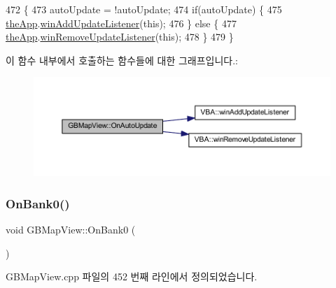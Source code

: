 \begin{DoxyCode}
472 \{
473   autoUpdate = !autoUpdate;
474   \textcolor{keywordflow}{if}(autoUpdate) \{
475     \mbox{\hyperlink{_v_b_a_8cpp_a8095a9d06b37a7efe3723f3218ad8fb3}{theApp}}.\mbox{\hyperlink{class_v_b_a_af0712f70a90d023ab8327a366be08174}{winAddUpdateListener}}(\textcolor{keyword}{this});
476   \} \textcolor{keywordflow}{else} \{
477     \mbox{\hyperlink{_v_b_a_8cpp_a8095a9d06b37a7efe3723f3218ad8fb3}{theApp}}.\mbox{\hyperlink{class_v_b_a_a2d31a0656df2230310aa8dc9e3a735d3}{winRemoveUpdateListener}}(\textcolor{keyword}{this});    
478   \}
479 \}
\end{DoxyCode}
이 함수 내부에서 호출하는 함수들에 대한 그래프입니다.\+:
\nopagebreak
\begin{figure}[H]
\begin{center}
\leavevmode
\includegraphics[width=350pt]{class_g_b_map_view_ad58a2f86c686e80be789229bdee2e64f_cgraph}
\end{center}
\end{figure}
\mbox{\label{class_g_b_map_view_a157cce075c5c7ad137098c04201ce30d}} 
\subsubsection{\texorpdfstring{On\+Bank0()}{OnBank0()}}
{\footnotesize\ttfamily void G\+B\+Map\+View\+::\+On\+Bank0 (\begin{DoxyParamCaption}{ }\end{DoxyParamCaption})\hspace{0.3cm}{\ttfamily [protected]}}



G\+B\+Map\+View.\+cpp 파일의 452 번째 라인에서 정의되었습니다.


